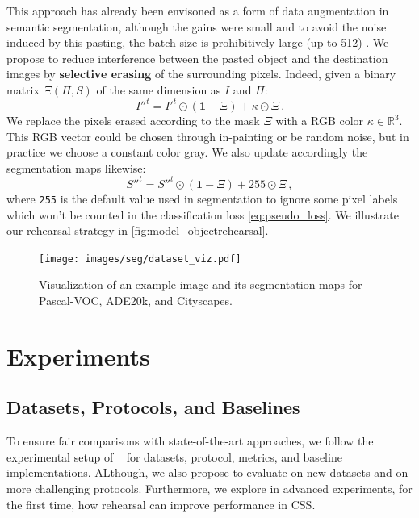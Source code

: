 This approach has already been envisoned as a form of data augmentation in semantic segmentation,
although the gains were small and to avoid the noise induced by this pasting, the batch size is
prohibitively large (up to 512) \citep{ghiasi2020simplecopypaste}. We propose to reduce interference
between the pasted object and the destination images by \textbf{selective erasing} of the
surrounding pixels. Indeed, given a binary matrix $\Xi(\Pi, S)$ of the same dimension as $I$ and
$\Pi$:
%
\begin{equation}
    {I''}^t = {I'}^t \odot (\mathbf{1} - \Xi) + \kappa \odot \Xi\,.
    \label{eq:erasing_pixel}
\end{equation}
%
We replace the pixels erased according to the mask $\Xi$ with a RGB color $\kappa \in \mathbb{R}^3$.
This RGB vector could be chosen through in-painting \citep{fang2019instaboost} or be random noise,
but in practice we choose a constant color gray. We also update accordingly the segmentation maps
likewise:
%
\begin{equation}
    {S''}^t = {S''}^t \odot (\mathbf{1} - \Xi) + 255 \odot \Xi\,,
    \label{eq:erasing_label}
\end{equation}
%
where \texttt{255} is the default value used in segmentation to ignore some pixel labels which won't
be counted in the classification loss \autoref{eq:pseudo_loss}. We illustrate our rehearsal strategy
in \autoref{fig:model_objectrehearsal}.



\begin{figure}
    \centering
    \texttt{[image: images/seg/dataset\_viz.pdf]}
    \vspace*{-0.3cm}
    \caption{Visualization of an example image and its segmentation maps for Pascal-VOC, ADE20k, and Cityscapes.}
    \label{fig:dataset_viz}
\end{figure}



\section{Experiments}

\subsection{Datasets, Protocols, and Baselines}
\label{sec:datasets_protocols}

To ensure fair comparisons with state-of-the-art approaches, we follow the experimental setup of
~\citep{cermelli2020modelingthebackground} for datasets, protocol, metrics, and baseline
implementations. ALthough, we also propose to evaluate on new datasets and on more challenging
protocols. Furthermore, we explore in advanced experiments, for the first time, how rehearsal can
improve performance in CSS.

